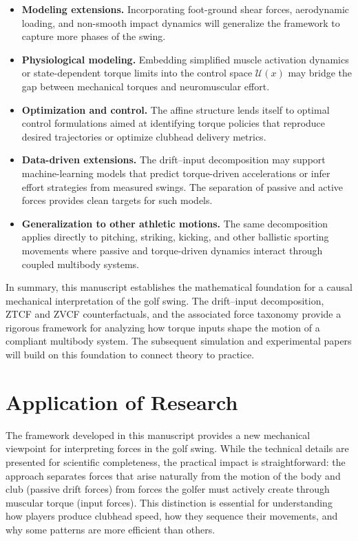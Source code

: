 \documentclass[12pt]{article}
\begin{document}
\begin{itemize}
  \item \textbf{Modeling extensions.}  
  Incorporating foot-ground shear forces, aerodynamic loading, and non-smooth impact dynamics will generalize the framework to capture more phases of the swing.

  \item \textbf{Physiological modeling.}  
  Embedding simplified muscle activation dynamics or state-dependent torque limits into the control space \(\mathcal{U}(x)\) may bridge the gap between mechanical torques and neuromuscular effort.

  \item \textbf{Optimization and control.}  
  The affine structure lends itself to optimal control formulations aimed at identifying torque policies that reproduce desired trajectories or optimize clubhead delivery metrics.

  \item \textbf{Data-driven extensions.}  
  The drift--input decomposition may support machine-learning models that predict torque-driven accelerations or infer effort strategies from measured swings. The separation of passive and active forces provides clean targets for such models.

  \item \textbf{Generalization to other athletic motions.}  
  The same decomposition applies directly to pitching, striking, kicking, and other ballistic sporting movements where passive and torque-driven dynamics interact through coupled multibody systems.
\end{itemize}

In summary, this manuscript establishes the mathematical foundation for a causal mechanical interpretation of the golf swing. The drift--input decomposition, ZTCF and ZVCF counterfactuals, and the associated force taxonomy provide a rigorous framework for analyzing how torque inputs shape the motion of a compliant multibody system. The subsequent simulation and experimental papers will build on this foundation to connect theory to practice.

\section*{Application of Research}

The framework developed in this manuscript provides a new mechanical viewpoint for interpreting forces in the golf swing. While the technical details are presented for scientific completeness, the practical impact is straightforward: the approach separates forces that arise naturally from the motion of the body and club (passive drift forces) from forces the golfer must actively create through muscular torque (input forces). This distinction is essential for understanding how players produce clubhead speed, how they sequence their movements, and why some patterns are more efficient than others.
\end{document}
